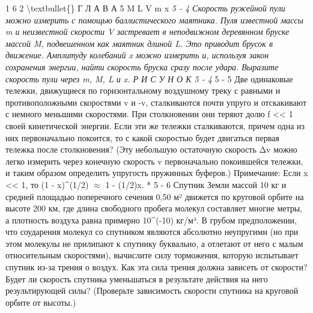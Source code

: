 \documentclass[10pt,oneside]{article}
\begin{document}
1 6 2 \textbackslash{}textbullet\{\} Г Л А В А  5 M L V m x \emph{ } \emph{ 5 - 4 Скорость ружейной пули можно измерить с помощью баллистического маятника. Пуля известной массы m и неизвестной скорости V застревает в неподвижном деревянном бруске массой M, подвешенном как маятник длиной L. Это приводит брусок в движение. Амплитуду колебаний x можно измерить и, используя закон сохранения энергии, найти скорость бруска сразу после удара. Выразите скорость пули через m, M, L и x. Р И С У Н О К  5 - 4 } \emph{ } 5 - 5 Две одинаковые тележки, движущиеся по горизонтальному воздушному треку с равными и противоположными скоростями v и -v, сталкиваются почти упруго и отскакивают с немного меньшими скоростями. При столкновении они теряют долю f << 1 своей кинетической энергии. Если эти же тележки сталкиваются, причем одна из них первоначально покоится, то с какой скоростью будет двигаться первая тележка после столкновения? (Эту небольшую остаточную скорость Δv можно легко измерить через конечную скорость v первоначально покоившейся тележки, и таким образом определить упругость пружинных буферов.) Примечание: Если x << 1, то (1 - x)\textasciicircum{}(1/2) \ensuremath{\approx} 1 - (1/2)x. \emph{ } * 5 - 6 Спутник Земли массой 10 кг и средней площадью поперечного сечения 0,50 м² движется по круговой орбите на высоте 200 км, где длина свободного пробега молекул составляет многие метры, а плотность воздуха равна примерно 10\textasciicircum{}(-10) кг/м³. В грубом предположении, что соударения молекул со спутником являются абсолютно неупругими (но при этом молекулы не прилипают к спутнику буквально, а отлетают от него с малым относительным скоростями), вычислите силу торможения, которую испытывает спутник из-за трения о воздух. Как эта сила трения должна зависеть от скорости? Будет ли скорость спутника уменьшаться в результате действия на него результирующей силы? (Проверьте зависимость скорости спутника на круговой орбите от высоты.)\par
\end{document}
